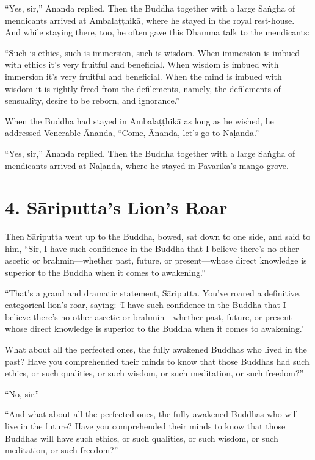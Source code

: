 \documentclass[12pt,openany]{book}%
\begin{document}
“Yes, sir,” Ānanda replied. Then the Buddha together with a large \textsanskrit{Saṅgha} of mendicants arrived at \textsanskrit{Ambalaṭṭhikā}, where he stayed in the royal rest-house. And while staying there, too, he often gave this Dhamma talk to the mendicants: 

“Such is ethics, such is immersion, such is wisdom. When immersion is imbued with ethics it’s very fruitful and beneficial. When wisdom is imbued with immersion it’s very fruitful and beneficial. When the mind is imbued with wisdom it is rightly freed from the defilements, namely, the defilements of sensuality, desire to be reborn, and ignorance.” 

When the Buddha had stayed in \textsanskrit{Ambalaṭṭhikā} as long as he wished, he addressed Venerable Ānanda, “Come, Ānanda, let’s go to \textsanskrit{Nāḷandā}.” 

“Yes, sir,” Ānanda replied. Then the Buddha together with a large \textsanskrit{Saṅgha} of mendicants arrived at \textsanskrit{Nāḷandā}, where he stayed in \textsanskrit{Pāvārika}’s mango grove. 

\section*{4. \textsanskrit{Sāriputta}’s Lion’s Roar }

Then \textsanskrit{Sāriputta} went up to the Buddha, bowed, sat down to one side, and said to him, “Sir, I have such confidence in the Buddha that I believe there’s no other ascetic or brahmin—whether past, future, or present—whose direct knowledge is superior to the Buddha when it comes to awakening.” 

“That’s a grand and dramatic statement, \textsanskrit{Sāriputta}. You’ve roared a definitive, categorical lion’s roar, saying: ‘I have such confidence in the Buddha that I believe there’s no other ascetic or brahmin—whether past, future, or present—whose direct knowledge is superior to the Buddha when it comes to awakening.’ 

What about all the perfected ones, the fully awakened Buddhas who lived in the past? Have you comprehended their minds to know that those Buddhas had such ethics, or such qualities, or such wisdom, or such meditation, or such freedom?” 

“No, sir.” 

“And what about all the perfected ones, the fully awakened Buddhas who will live in the future? Have you comprehended their minds to know that those Buddhas will have such ethics, or such qualities, or such wisdom, or such meditation, or such freedom?” 
\end{document}
